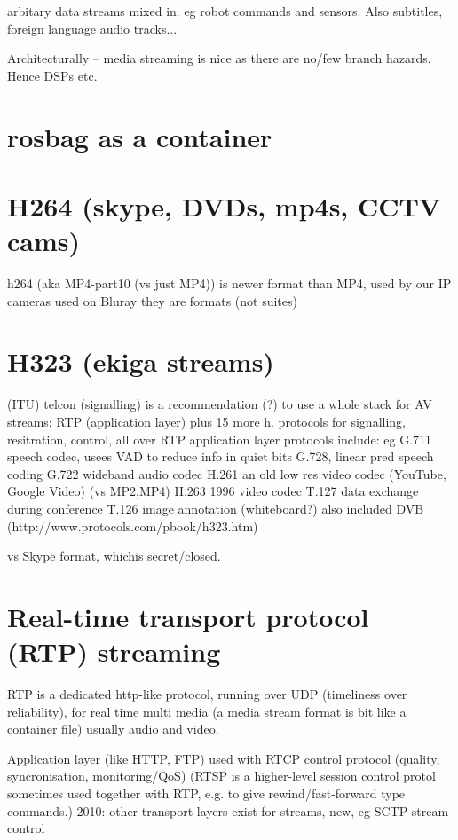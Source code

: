 \documentclass[oneside,english]{scrbook}
\begin{document}
arbitary data streams mixed in. eg robot commands and sensors. Also
subtitles, foreign language audio tracks...

Architecturally -- media streaming is nice as there are no/few branch hazards. Hence DSPs etc.

\chapter{rosbag as a container}


\chapter{H264 (skype, DVDs, mp4s, CCTV cams)}
h264 (aka MP4-part10 (vs just MP4)) is newer format than MP4, used by our IP cameras
	used on Bluray
	they are formats (not suites)


\chapter{H323 (ekiga streams)}
 (ITU) telcon  (signalling)
	is a recommendation (?) to use a whole stack for AV streams:
		RTP (application layer)		
		plus 15 more h. protocols for signalling, resitration, control, all over RTP
		application layer protocols include:
			eg G.711 speech codec, usees VAD to reduce info in quiet bits
			    G.728, linear pred speech coding
			G.722 wideband audio codec
			H.261 an old low res video codec (YouTube, Google Video) (vs MP2,MP4)
			H.263 1996 video codec
			T.127 data exchange during conference
			T.126 image annotation (whiteboard?)
		also included DVB
		(http://www.protocols.com/pbook/h323.htm)

vs Skype format, whichis secret/closed.


\chapter{Real-time transport protocol (RTP) streaming}

RTP is a dedicated http-like protocol, running over UDP (timeliness over reliability), for real time multi media (a media stream format is bit like a container file) usually audio and video.

Application layer (like HTTP, FTP)
	used with RTCP control protocol (quality, syncronisation, monitoring/QoS)
	(RTSP is a higher-level session control protol sometimes used together with RTP, e.g. to give rewind/fast-forward type commands.)
		2010: other transport layers exist for streams, new, eg SCTP stream control
\end{document}
